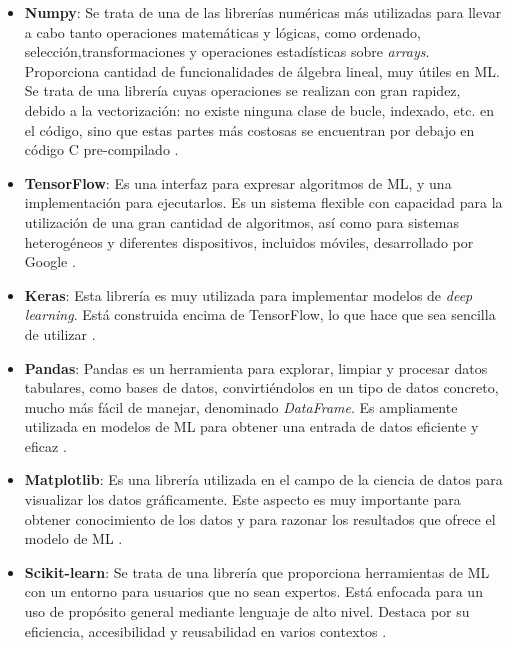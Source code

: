 \begin{itemize}
    \item \textbf{Numpy}: Se trata de una de las librerías numéricas más utilizadas para llevar a cabo tanto operaciones matemáticas y lógicas, como ordenado, selección,transformaciones y operaciones estadísticas  sobre \textit{arrays}. Proporciona cantidad de funcionalidades de álgebra lineal, muy útiles en \gls{ML}. Se trata de una librería cuyas operaciones se realizan con gran rapidez, debido a la vectorización: no existe ninguna clase de bucle, indexado, etc. en el código, sino que estas partes más costosas se encuentran por debajo en código C pre-compilado \cite{NMPYDOC}. 
    
    \item \textbf{TensorFlow}: Es una interfaz para expresar algoritmos de \gls{ML}, y una implementación para ejecutarlos. Es un sistema flexible con capacidad para la utilización de una gran cantidad de algoritmos, así como para sistemas heterogéneos y diferentes dispositivos, incluidos móviles, desarrollado por Google \cite{45166}.
    
    \item \textbf{Keras}: Esta librería es muy utilizada para implementar modelos de \textit{deep learning}. Está construida encima de TensorFlow, lo que hace que sea sencilla de utilizar \cite{MML2018}.
     
    \item \textbf{Pandas}: Pandas es un herramienta para explorar, limpiar y procesar datos tabulares, como bases de datos, convirtiéndolos en un tipo de datos concreto, mucho más fácil de manejar, denominado \textit{DataFrame}. Es ampliamente utilizada en modelos de \gls{ML} para obtener una entrada de datos eficiente y eficaz \cite{PNDSDOC}. 
    
    \item \textbf{Matplotlib}: Es una librería utilizada en el campo de la ciencia de datos para visualizar los datos gráficamente. Este aspecto es muy importante para obtener conocimiento de los datos y para razonar los resultados que ofrece el modelo de \gls{ML} \cite{MML2018}.
    
    \item \textbf{Scikit-learn}: Se trata de una librería que proporciona herramientas de \gls{ML} con un entorno para usuarios que no sean expertos. Está enfocada para un uso de propósito general mediante lenguaje de alto nivel. Destaca por su eficiencia, accesibilidad y reusabilidad en varios contextos \cite{sklearn_api}.

\end{itemize}

